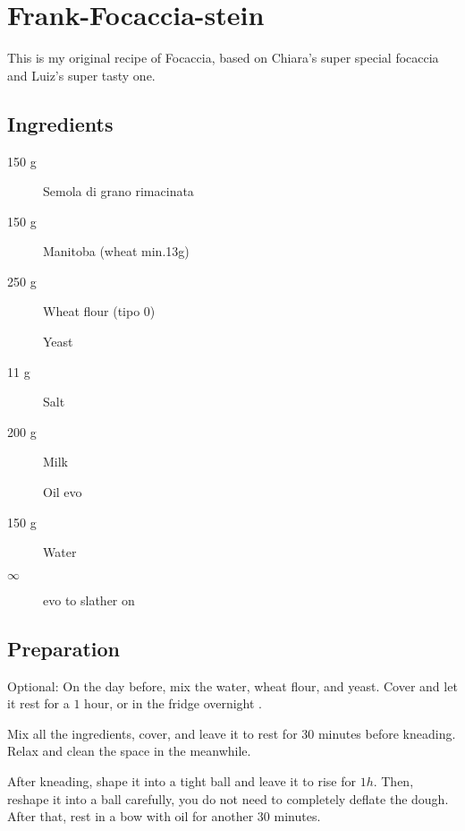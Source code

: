 \setchapterpreamble[u]{\margintoc}
\chapter{Frank-Focaccia-stein}

This is my original recipe of Focaccia, based on Chiara's super special focaccia and Luiz's super tasty one.

\section{Ingredients}

\begin{multicols}{2}
\begin{description}
	\item[150 g] Semola di grano rimacinata
	\item[150 g] Manitoba (wheat min.13g)
	\item[250 g] Wheat flour (tipo 0)
	
	\item[] Yeast
	\item[11 g] Salt
	\item[200 g] Milk
	\item[] Oil \gls{evo}
	
	
	\item[150 g] Water
	\item[$\infty$] \gls{evo} to slather on
\end{description}
\end{multicols}	

\section{Preparation}
Optional:
On the day before, mix the water, wheat flour, and yeast.
Cover and let it rest for a $1$ hour, or in the fridge overnight .

Mix all the ingredients, cover, and leave it to rest for $30$ minutes before kneading.
%
Relax and clean the space in the meanwhile.

After kneading, shape it into a tight ball and leave it to rise for $1h$.
%
Then, reshape it into a ball carefully, you do not need to completely deflate the dough.
%
After that, rest in a bow with oil for another $30$ minutes.

